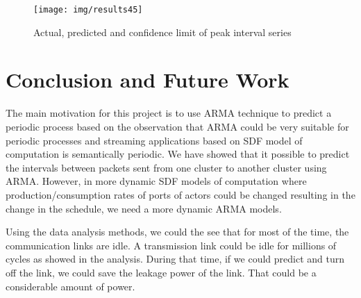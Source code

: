 \documentclass[12pt]{article}
\begin{document}
\begin{figure}[ht!]
\centering
\texttt{[image: img/results45]}
\caption{Actual, predicted and confidence limit of peak interval
series}\label{fig:results45}
\end{figure}

\section{Conclusion and Future Work}
The main motivation for this project is to use ARMA technique to predict a
periodic process based on the observation that ARMA could be very suitable for
periodic processes and streaming applications based on SDF model of computation
is semantically periodic. We have showed that it possible to predict the
intervals between packets sent from one cluster to another cluster using ARMA.
However, in more dynamic SDF models of computation where
production/consumption rates of ports of actors could be changed resulting in
the change in the schedule, we need a more dynamic ARMA models. 

Using the data analysis methods, we could the see that for most of the time, the
communication links are idle. A transmission link could be idle for millions of
cycles as showed in the analysis. During that time, if we could predict and turn
off the link, we could save the leakage power of the link. That could be a
considerable amount of power.



\end{document}
